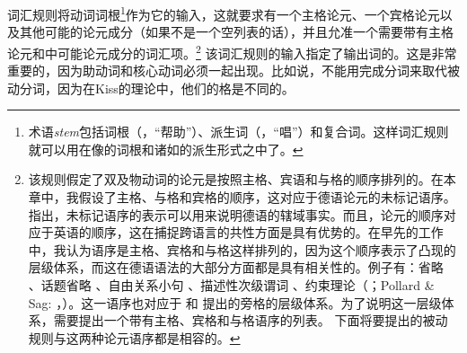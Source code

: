 \noindent
词汇规则将动词词根\footnote{%
术语\emph{stem}包括词根（，“帮助”）、派生词（，“唱”）和复合词。这样词汇规则就可以用在像的词根和诸如的派生形式之中了。
}作为它的输入，这就要求有一个主格论元、一个宾格论元以及其他可能的论元成分（如果不是一个空列表的话），并且允准一个需要带有主格论元和中可能论元成分的词汇项。\footnote{%
该规则假定了双及物动词的论元是按照主格、宾语和与格的顺序排列的。在本章中，我假设了主格、与格和宾格的顺序，这对应于德语论元的未标记语序。 \citet{Kiss2001a}指出，未标记语序的表示可以用来说明德语的辖域事实。而且，论元的顺序对应于英语的顺序，这在捕捉跨语言的共性方面是具有优势的。在早先的工作中，我认为语序是主格、宾格和与格这样排列的，因为这个顺序表示了凸现的层级体系，而这在德语语法的大部分方面都是具有相关性的。例子有：省略 \citep{Klein85}、话题省略 \citep{Fries88b}、自由关系小句 \citep{Bausewein90,Pittner95b,Mueller99b}、描述性次级谓词 \citep{Mueller2001c,Mueller2002b,Mueller2008a}、约束理论（\citealp{Grewendorf85a}；Pollard \& Sag: \citeyear{PS92}，\citeyear[\S~6]{ps2}）。这一语序也对应于 \citet{KC77a}和 \citet{Pullum77a}提出的旁格的层级体系。为了说明这一层级体系，需要提出一个带有主格、宾格和与格语序的列表。
下面将要提出的被动规则与这两种论元语序都是相容的。
} 该词汇规则的输入指定了输出词的\vformvc。这是非常重要的，因为助动词和核心动词必须一起出现。比如说，不能用完成分词来取代被动分词，因为在Kiss的理论中，他们的格是不同的。
